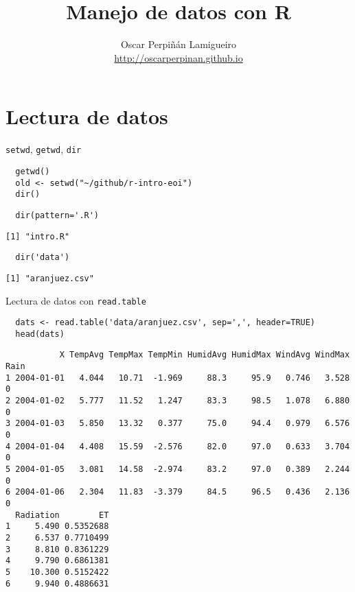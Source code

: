 \documentclass[xcolor={usenames,svgnames,dvipsnames}]{beamer}
\author{Oscar Perpiñán Lamigueiro \\ \url{http://oscarperpinan.github.io}}
\date{}
\title{Manejo de datos con R}
\begin{document}
\maketitle

\section{Lectura de datos}
\label{sec-1}
\begin{frame}[fragile,label=sec-1-1]{\texttt{setwd}, \texttt{getwd}, \texttt{dir}}
 \lstset{language=R,label= ,caption= ,numbers=none}
\begin{lstlisting}
  getwd()
  old <- setwd("~/github/r-intro-eoi")
  dir()
\end{lstlisting}

\lstset{language=R,label= ,caption= ,numbers=none}
\begin{lstlisting}
  dir(pattern='.R')
\end{lstlisting}

\begin{verbatim}
[1] "intro.R"
\end{verbatim}

\lstset{language=R,label= ,caption= ,numbers=none}
\begin{lstlisting}
  dir('data')
\end{lstlisting}

\begin{verbatim}
[1] "aranjuez.csv"
\end{verbatim}
\end{frame}

\begin{frame}[fragile,label=sec-1-2]{Lectura de datos con \texttt{read.table}}
 \lstset{language=R,label= ,caption= ,numbers=none}
\begin{lstlisting}
  dats <- read.table('data/aranjuez.csv', sep=',', header=TRUE)
  head(dats)
\end{lstlisting}

\begin{verbatim}
           X TempAvg TempMax TempMin HumidAvg HumidMax WindAvg WindMax Rain
1 2004-01-01   4.044   10.71  -1.969     88.3     95.9   0.746   3.528    0
2 2004-01-02   5.777   11.52   1.247     83.3     98.5   1.078   6.880    0
3 2004-01-03   5.850   13.32   0.377     75.0     94.4   0.979   6.576    0
4 2004-01-04   4.408   15.59  -2.576     82.0     97.0   0.633   3.704    0
5 2004-01-05   3.081   14.58  -2.974     83.2     97.0   0.389   2.244    0
6 2004-01-06   2.304   11.83  -3.379     84.5     96.5   0.436   2.136    0
  Radiation        ET
1     5.490 0.5352688
2     6.537 0.7710499
3     8.810 0.8361229
4     9.790 0.6861381
5    10.300 0.5152422
6     9.940 0.4886631
\end{verbatim}
\end{frame}
\end{document}
